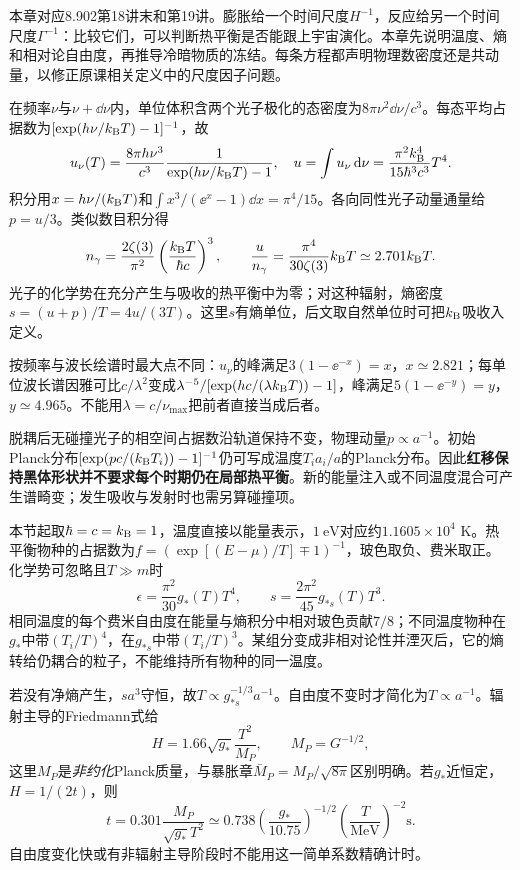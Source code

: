 本章对应8.902第18讲末和第19讲。膨胀给一个时间尺度$H^{-1}$，反应给另一个时间尺度$\Gamma^{-1}$：比较它们，可以判断热平衡是否能跟上宇宙演化。本章先说明温度、熵和相对论自由度，再推导冷暗物质的冻结。每条方程都声明物理数密度还是共动量，以修正原课相关定义中的尺度因子问题。

在频率$\nu$与$\nu+\dd\nu$内，单位体积含两个光子极化的态密度为$8\pi\nu^2\dd\nu/c^3$。每态平均占据数为$[\exp(h\nu/k_{\mathrm B} T)-1]^{-1}$，故
\[
 u_\nu(T)=\frac{8\pi h\nu^3}{c^3}\frac1{\exp(h\nu/k_{\mathrm B} T)-1},\quad
 u=\int u_\nu\,\mathrm d\nu=\frac{\pi^2k_{\mathrm B}^4}{15\hbar^3c^3}T^4.
\]
积分用$x=h\nu/(k_{\mathrm B} T)$和$\int x^3/(\ee^x-1)\dd x=\pi^4/15$。各向同性光子动量通量给$p=u/3$。类似数目积分得
\[
 n_\gamma=\frac{2\zeta(3)}{\pi^2}\left(\frac{k_{\mathrm B} T}{\hbar c}\right)^3,
 \qquad \frac{u}{n_\gamma}=\frac{\pi^4}{30\zeta(3)}k_{\mathrm B} T\simeq2.701k_{\mathrm B} T.
\]
光子的化学势在充分产生与吸收的热平衡中为零；对这种辐射，熵密度$s=(u+p)/T=4u/(3T)$。这里$s$有熵单位，后文取自然单位时可把$k_{\mathrm B}$吸收入定义。

按频率与波长绘谱时最大点不同：$u_\nu$的峰满足$3(1-\ee^{-x})=x$，$x\simeq2.821$；每单位波长谱因雅可比$c/\lambda^2$变成$\lambda^{-5}/[\exp(hc/(\lambda k_{\mathrm B} T))-1]$，峰满足$5(1-\ee^{-y})=y$，$y\simeq4.965$。不能用$\lambda=c/\nu_{\max}$把前者直接当成后者。

脱耦后无碰撞光子的相空间占据数沿轨道保持不变，物理动量$p\propto a^{-1}$。初始Planck分布$[\exp(pc/(k_{\mathrm B} T_i))-1]^{-1}$仍可写成温度$T_i a_i/a$的Planck分布。因此\textbf{红移保持黑体形状并不要求每个时期仍在局部热平衡}。新的能量注入或不同温度混合可产生谱畸变；发生吸收与发射时也需另算碰撞项。

本节起取$\hbar=c=k_{\mathrm B}=1$，温度直接以能量表示，$1\ \mathrm{eV}$对应约$1.1605\times10^4$ K。热平衡物种的占据数为$f=(\exp[(E-\mu)/T]\mp1)^{-1}$，玻色取负、费米取正。化学势可忽略且$T\gg m$时
\[
 \epsilon=\frac{\pi^2}{30}g_*(T)T^4,\qquad
 s=\frac{2\pi^2}{45}g_{*s}(T)T^3.
\]
相同温度的每个费米自由度在能量与熵积分中相对玻色贡献$7/8$；不同温度物种在$g_*$中带$(T_i/T)^4$，在$g_{*s}$中带$(T_i/T)^3$。某组分变成非相对论性并湮灭后，它的熵转给仍耦合的粒子，不能维持所有物种的同一温度。

若没有净熵产生，$sa^3$守恒，故$T\propto g_{*s}^{-1/3}a^{-1}$。自由度不变时才简化为$T\propto a^{-1}$。辐射主导的Friedmann式给
\[
 H=1.66\sqrt{g_*}\frac{T^2}{M_P},\qquad M_P=G^{-1/2},
\]
这里$M_P$是\emph{非约化}Planck质量，与暴胀章$\bar M_P=M_P/\sqrt{8\pi}$区别明确。若$g_*$近恒定，$H=1/(2t)$，则
\[
 t=0.301\frac{M_P}{\sqrt{g_*}T^2}
 \simeq0.738\left(\frac{g_*}{10.75}\right)^{-1/2}
 \left(\frac{T}{\mathrm{MeV}}\right)^{-2}\mathrm s.
\]
自由度变化快或有非辐射主导阶段时不能用这一简单系数精确计时。

